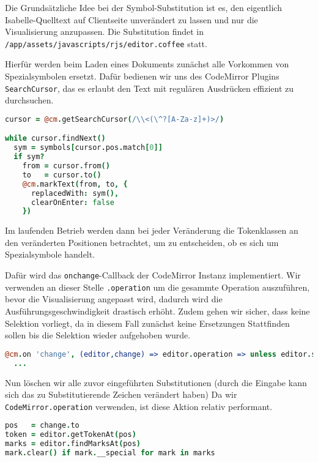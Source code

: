 Die Grundsätzliche Idee bei der Symbol-Substitution ist es, den eigentlich Isabelle-Quelltext auf
Clientseite unverändert zu lassen und nur die Visualisierung anzupassen. Die Substitution findet in
\texttt{/app/assets/javascripts/rjs/editor.coffee} statt.

Hierfür werden beim Laden eines Dokuments zunächst alle Vorkommen von Spezialsymbolen ersetzt. Dafür
bedienen wir uns des CodeMirror Plugins \texttt{SearchCursor}, das es erlaubt den Text mit regulären
Ausdrücken effizient zu durchsuchen.

\begin{lstlisting}[language=coffee]
cursor = @cm.getSearchCursor(/\\<(\^?[A-Za-z]+)>/)

while cursor.findNext()
  sym = symbols[cursor.pos.match[0]]
  if sym?
    from = cursor.from()
    to   = cursor.to()
    @cm.markText(from, to, {
      replacedWith: sym(),
      clearOnEnter: false
    })
\end{lstlisting}

Im laufenden Betrieb werden dann bei jeder Veränderung die Tokenklassen an den veränderten
Positionen betrachtet, um zu entscheiden, ob es sich um Spezialsymbole handelt.

Dafür wird das \texttt{onchange}-Callback der CodeMirror Instanz implementiert. Wir verwenden an
dieser Stelle \texttt{.operation} um die gesammte Operation auszuführen, bevor die Visualisierung
angepasst wird, dadurch wird die Ausführungsgeschwindigkeit drastisch erhöht. Zudem gehen wir
sicher, dass keine Selektion vorliegt, da in diesem Fall zunächst keine Ersetzungen Stattfinden
sollen bis die Selektion wieder aufgehoben wurde.

\begin{lstlisting}[language=coffee]
@cm.on 'change', (editor,change) => editor.operation => unless editor.somethingSelected()
  ...
\end{lstlisting}

Nun löschen wir alle zuvor eingeführten Substitutionen (durch die Eingabe kann sich das zu
Substitutierende Zeichen verändert haben) Da wir \texttt{CodeMirror.operation} verwenden, ist diese
Aktion relativ performant.

\begin{lstlisting}[language=coffee]
pos   = change.to
token = editor.getTokenAt(pos)          
marks = editor.findMarksAt(pos)
mark.clear() if mark.__special for mark in marks 
\end{lstlisting}

